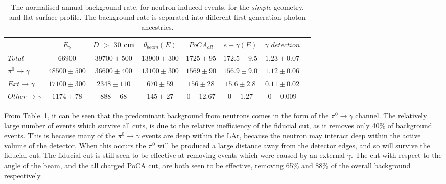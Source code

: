 \begin{table}[h!]
  \caption[The normalised annual background rate, for neutron induced events, for the \emph{simple} geometry, and flat surface profile]
          {The normalised annual background rate, for neutron induced events, for the \emph{simple} geometry, and flat surface profile. The background rate is separated into different first generation photon ancestries.}
  \label{tab:SurfNeuSimp}
  \centering
  \scriptsize
  \begin{tabular}{l c c c c c c c }
    \toprule
        & $E_\gamma$ &  $D$ $>$ $30$ cm & $\theta_{beam}(E)$ & $PoCA_{all}$ & $e-\gamma(E)$ & $\gamma$ $detection$ \\
        \midrule
        $Total$          & $66900$       & $39700\pm500$ & $13900\pm300$ & $1725\pm95$ & $172.5\pm9.5$ & $1.23\pm0.07$ \\

        $\pi^0\to\gamma$ & $48500\pm500$ & $36600\pm400$ & $13100\pm300$ & $1569\pm90$ & $156.9\pm9.0$ & $1.12\pm0.06$ \\

        $Ext\to\gamma$   & $17100\pm300$ & $2348\pm110$  & $670\pm59$    & $156\pm28$  & $15.6\pm2.8$  & $0.11\pm0.02$ \\

        $Other\to\gamma$ & $1174\pm78$   & $888\pm68$    & $145\pm27$    & $0-12.67$   & $0-1.27$      & $0-0.009$ \\
        \bottomrule
  \end{tabular}
\end{table}

From Table~\ref{tab:SurfNeuSimp}, it can be seen that the predominant background from neutrons comes in the form of the $\pi^0\to\gamma$ channel. The relatively large number of events which survive all cuts, is due to the relative inefficiency of the fiducial cut, as it removes only 40\% of background events. This is because many of the $\pi^0\to\gamma$ events are deep within the LAr, because the neutron may interact deep within the active volume of the detector. When this occurs the $\pi^0$ will be produced a large distance away from the detector edges, and so will survive the fiducial cut. The fiducial cut is still seen to be effective at removing events which were caused by an external $\gamma$. The cut with respect to the angle of the beam, and the all charged PoCA cut, are both seen to be effective, removing 65\% and 88\% of the overall background respectively. \\

